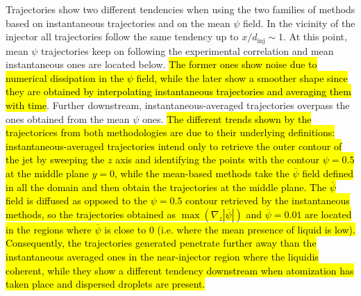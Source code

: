 Trajectories show two different tendencies when using the two families of methods based on instantaneous trajectories and on the mean $\psi$ field. In the vicinity of the injector all trajectories follow the same tendency up to $x/d_\mathrm{inj} \sim 1$. At this point, mean $\psi$ trajectories keep on following the experimental correlation and mean instantaneous ones are located below. \hl{The former ones show noise due to numerical dissipation in the $\psi$ field, while the later show a smoother shape since they are obtained by interpolating instantaneous trajectories and averaging them with time}. Further downstream, instantaneous-averaged trajectories overpass the ones obtained from the mean $\psi$ ones. \hl{The different trends shown by the trajectorices from both methodologies are due to their underlying definitions: instantaneous-averaged trajectories intend only to retrieve the outer contour of the jet by sweeping the $z$ axis and identifying the points with the contour $\psi = 0.5$ at the middle plane $y = 0$, while the mean-based methods take the $\overline{\psi}$ field defined in all the domain and then obtain the trajectories at the middle plane. The $\overline{\psi}$ field is diffused as opposed to the $\psi = 0.5$ contour retrieved by the instantaneous methods, so the trajectories obtained as $\max \left( \nabla_z | \overline{\psi} | \right)$ and $\overline{\psi} = 0.01$ are located in the regions where $\overline{\psi}$ is close to $0$ (i.e. where the mean presence of liquid is low). Consequently, the trajectories generated penetrate further away than the instantaneous averaged ones in the near-injector region where the liquidis coherent, while they show a different tendency downstream when atomization has taken place and dispersed droplets are present.}


